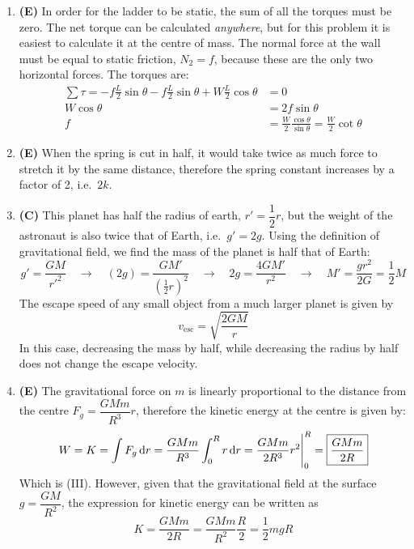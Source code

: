 \documentclass{../oss-handout}
\begin{document}
\begin{enumerate}[leftmargin=17pt]
\item\textbf{(E)} In order for the ladder to be static, the sum of all the
  torques must be zero. The net torque can be calculated \emph{anywhere}, but
  for this problem it is easiest to calculate it at the centre of mass. The
  normal force at the wall must be equal to static friction, $N_2=f$, because
  these are the only two horizontal forces. The torques are:
  \begin{align*}
    \sum\tau=-f\frac L2\sin\theta-f\frac L2\sin\theta+W\frac L2\cos\theta&=0\\
    W\cos\theta&=2f\sin\theta\\
    f&=\frac W2\frac{\cos\theta}{\sin\theta}=\boxed{\frac W2\cot\theta}
  \end{align*}

\item\textbf{(E)} When the spring is cut in half, it would take twice as much
  force to stretch it by the same distance, therefore the spring constant
  increases by a factor of 2, i.e.\ $\boxed{2k}$.

\item\textbf{(C)} This planet has half the radius of earth, $r'=\dfrac12 r$, but
  the weight of the astronaut is also twice that of Earth, i.e.\ $g'=2g$. Using
  the definition of gravitational field, we find the mass of the planet is half
  that of Earth:
  \begin{equation*}
    g'=\frac{GM}{r'^2}\quad\longrightarrow\quad
    (2g)=\frac{GM'}{(\frac12r)^2}\quad\longrightarrow\quad
    2g=\frac{4GM'}{r^2}\quad\longrightarrow\quad
    M'=\frac{gr^2}{2G}=\frac12M
  \end{equation*}
  The escape speed of any small object from a much larger planet is given by
  \begin{equation*}
    v_\text{esc}=\sqrt{\frac{2GM}r}
  \end{equation*}
  In this case, decreasing the mass by half, while decreasing the radius by half
  does not change the escape velocity.
\item\textbf{(E)} The gravitational force on $m$ is linearly proportional
  to the distance from the centre $F_g=\dfrac{GMm}{R^3}r$, therefore the kinetic
  energy at the centre is given by:
  \begin{equation*}
    W=K=\int F_g\dl r=\frac{GMm}{R^3}\int_0^R r\dl r=
    \frac{GMm}{2R^3}r^2\Biggr|^R_0=\boxed{\frac{GMm}{2R}}
  \end{equation*}
  Which is (III). However, given that the gravitational field at the surface
  $g=\dfrac{GM}{R^2}$, the expression for kinetic energy can be written as
  \begin{equation*}
    K=\frac{GMm}{2R}=\frac{GMm}{R^2}\frac R2=\boxed{\frac12mgR}
  \end{equation*}
\end{enumerate}
\end{document}
